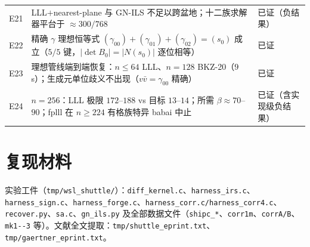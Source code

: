 \documentclass[11pt,a4paper]{ctexart}
\begin{document}
\begin{longtable}{p{0.6cm}p{7.6cm}p{5.6cm}}
E21 & LLL$+$nearest-plane 与 GN-ILS 不足以跨盆地；十二族求解器平台于 $\approx300/768$ & 已证（负结果）\\
E22 & 精确 $\gamma$ 理想恒等式 $(\gamma_{00}){+}(\gamma_{01}){+}(\gamma_{02}){=}(s_0)$ 成立（$5/5$ 键，$|\det B_0|{=}|N(s_0)|$ 逐位相等） & 已证\\
E23 & 理想管线端到端恢复：$n{\le}64$ LLL、$n{=}128$ BKZ-20（$9$ s）；生成元单位歧义不出现（$v\bar v{=}\gamma_{00}$ 精确） & 已证\\
E24 & $n{=}256$：LLL 极限 $172$--$188$ vs 目标 $13$--$14$；所需 $\beta\approx70$--$90$；fplll 在 $n{\ge}224$ 有格族特异 babai 中止 & 已证（含实现级负结果）\\
\bottomrule
\end{longtable}

\section{复现材料}

实验工件（\texttt{tmp/wsl\_shuttle/}）：\texttt{diff\_kernel.c}、\texttt{harness\_irs.c}、\texttt{harness\_sign.c}、\texttt{harness\_forge.c}、\texttt{harness\_corr.c/harness\_corr4.c}、\texttt{recover.py}、\texttt{sa.c}、\texttt{gn\_ils.py} 及全部数据文件（\texttt{shipc\_*}、\texttt{corr1m}、\texttt{corrA/B}、\texttt{mk1\texttt--3} 等）。文献全文提取：\texttt{tmp/shuttle\_eprint.txt}、\texttt{tmp/gaertner\_eprint.txt}。
\end{document}
